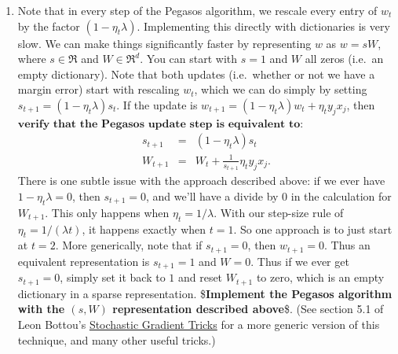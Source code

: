 \documentclass[11pt]{article}
\providecommand{\tightlist}{%
      \setlength{\itemsep}{0pt}\setlength{\parskip}{0pt}}
\begin{document}
    \begin{enumerate}
\def\labelenumi{\arabic{enumi}.}
\setcounter{enumi}{4}
\tightlist
\item
  Note that in every step of the Pegasos algorithm, we rescale every
  entry of \(w_{t}\) by the factor \((1-\eta_{t}\lambda)\). Implementing
  this directly with dictionaries is very slow. We can make things
  significantly faster by representing \(w\) as \(w=sW\), where
  \(s\in\Re\) and \(W\in\Re^{d}\). You can start with \(s=1\) and \(W\)
  all zeros (i.e.~an empty dictionary). Note that both updates
  (i.e.~whether or not we have a margin error) start with rescaling
  \(w_{t}\), which we can do simply by setting
  \(s_{t+1}=\left(1-\eta_{t}\lambda\right)s_{t}\). If the update is
  \(w_{t+1}=(1-\eta_{t}\lambda)w_{t}+\eta_{t}y_{j}x_{j}\), then
  \(\textbf{verify that the Pegasos update step is equivalent to}\): \[
  \begin{eqnarray*}
  s_{t+1} & = & \left(1-\eta_{t}\lambda\right)s_{t}\\
  W_{t+1} & = & W_{t}+\frac{1}{s_{t+1}}\eta_{t}y_{j}x_{j}.
  \end{eqnarray*}
  \] There is one subtle issue with the approach described above: if we
  ever have \(1-\eta_{t}\lambda=0\), then \(s_{t+1}=0\), and we'll have
  a divide by \(0\) in the calculation for \(W_{t+1}\). This only
  happens when \(\eta_{t}=1/\lambda\). With our step-size rule of
  \(\eta_{t}=1/\left(\lambda t\right)\), it happens exactly when
  \(t=1\). So one approach is to just start at \(t=2\). More
  generically, note that if \(s_{t+1}=0\), then \(w_{t+1}=0\). Thus an
  equivalent representation is \(s_{t+1}=1\) and \(W=0\). Thus if we
  ever get \(s_{t+1}=0\), simply set it back to \(1\) and reset
  \(W_{t+1}\) to zero, which is an empty dictionary in a sparse
  representation.
  \$\textbf{Implement the Pegasos algorithm with the $(s,W)$ representation
  described above}\$. (See section 5.1 of Leon Bottou's
  \href{http://leon.bottou.org/papers/bottou-tricks-2012}{Stochastic
  Gradient Tricks} for a more generic version of this technique, and
  many other useful tricks.)
\end{enumerate}
\end{document}
